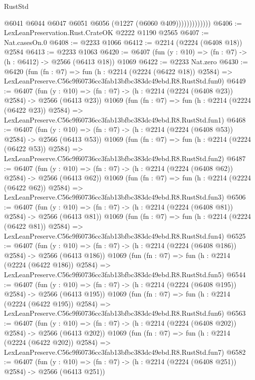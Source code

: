 \begin{lexlean}{RustStd}
\begin{coremodule}
                          @6041
                          @6044
                          @6047
                          @6051
                          @6056
                          (@1227 (@6060 @409)))))))))))))
@6406 := LexLeanPreservation.Rust.CrateOK @2222 @1190 @2565
@6407 := Nat.casesOn.{0}
@6408 := @2233 @1066
@6412 := @2214 (@2224 (@6408 @18)) @2584
@6413 := @2233 @1063
@6420 := @6407 (fun (y : @10) => (fn : @7) -> (h : @6412) -> @2566 (@6413 @18)) @1069
@6422 := @2233 Nat.zero
@6430 := @6420
    (fun (fn : @7) =>
    fun (h : @2214 (@2224 (@6422 @18)) @2584) =>
    LexLeanPreserve.C56c9f60736cc3fab13bfbc383dc49ebd.R8.RustStd.fun0)
@6449 := @6407
    (fun (y : @10) => (fn : @7) -> (h : @2214 (@2224 (@6408 @23)) @2584) -> @2566 (@6413 @23))
    @1069
    (fun (fn : @7) =>
    fun (h : @2214 (@2224 (@6422 @23)) @2584) =>
    LexLeanPreserve.C56c9f60736cc3fab13bfbc383dc49ebd.R8.RustStd.fun1)
@6468 := @6407
    (fun (y : @10) => (fn : @7) -> (h : @2214 (@2224 (@6408 @53)) @2584) -> @2566 (@6413 @53))
    @1069
    (fun (fn : @7) =>
    fun (h : @2214 (@2224 (@6422 @53)) @2584) =>
    LexLeanPreserve.C56c9f60736cc3fab13bfbc383dc49ebd.R8.RustStd.fun2)
@6487 := @6407
    (fun (y : @10) => (fn : @7) -> (h : @2214 (@2224 (@6408 @62)) @2584) -> @2566 (@6413 @62))
    @1069
    (fun (fn : @7) =>
    fun (h : @2214 (@2224 (@6422 @62)) @2584) =>
    LexLeanPreserve.C56c9f60736cc3fab13bfbc383dc49ebd.R8.RustStd.fun3)
@6506 := @6407
    (fun (y : @10) => (fn : @7) -> (h : @2214 (@2224 (@6408 @81)) @2584) -> @2566 (@6413 @81))
    @1069
    (fun (fn : @7) =>
    fun (h : @2214 (@2224 (@6422 @81)) @2584) =>
    LexLeanPreserve.C56c9f60736cc3fab13bfbc383dc49ebd.R8.RustStd.fun4)
@6525 := @6407
    (fun (y : @10) => (fn : @7) -> (h : @2214 (@2224 (@6408 @186)) @2584) -> @2566 (@6413 @186))
    @1069
    (fun (fn : @7) =>
    fun (h : @2214 (@2224 (@6422 @186)) @2584) =>
    LexLeanPreserve.C56c9f60736cc3fab13bfbc383dc49ebd.R8.RustStd.fun5)
@6544 := @6407
    (fun (y : @10) => (fn : @7) -> (h : @2214 (@2224 (@6408 @195)) @2584) -> @2566 (@6413 @195))
    @1069
    (fun (fn : @7) =>
    fun (h : @2214 (@2224 (@6422 @195)) @2584) =>
    LexLeanPreserve.C56c9f60736cc3fab13bfbc383dc49ebd.R8.RustStd.fun6)
@6563 := @6407
    (fun (y : @10) => (fn : @7) -> (h : @2214 (@2224 (@6408 @202)) @2584) -> @2566 (@6413 @202))
    @1069
    (fun (fn : @7) =>
    fun (h : @2214 (@2224 (@6422 @202)) @2584) =>
    LexLeanPreserve.C56c9f60736cc3fab13bfbc383dc49ebd.R8.RustStd.fun7)
@6582 := @6407
    (fun (y : @10) => (fn : @7) -> (h : @2214 (@2224 (@6408 @251)) @2584) -> @2566 (@6413 @251))

\end{coremodule}
\end{lexlean}
